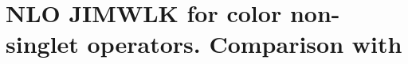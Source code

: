 \documentclass[11pt,a4paper]{article}
\begin{document}

\section{NLO JIMWLK for color non-singlet operators. Comparison with \cite{BClast} }


\end{document}
